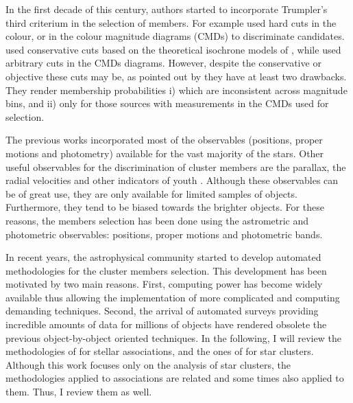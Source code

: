 In the first decade of this century, authors started to incorporate Trumpler's third criterium in the selection of members. For example \citet{2003A&A...400..891M, 2004A&A...416..125D,2007A&A...470..585B,Lodieu2012} used hard cuts in the colour, or in the colour magnitude diagrams (CMDs) to discriminate candidates. \citet{2003A&A...400..891M} used conservative cuts based on the theoretical isochrone models of \citet{1998A&A...337..403B}, while \citet{2004A&A...416..125D,2007A&A...470..585B,Lodieu2012} used arbitrary cuts in the CMDs diagrams. However, despite the conservative or objective these cuts may be, as pointed out by \citet{Sarro2014} they have at least two drawbacks. They render membership probabilities i) which are inconsistent across magnitude bins, and ii) only for those sources with measurements in the CMDs used for selection.
  
The previous works incorporated most of the observables (positions, proper motions and photometry) available for the vast majority of the stars. Other useful observables for the discrimination of cluster members are the parallax, the radial velocities and other indicators of youth \cite[e.g. lithium abundance, photospheric activity, rotation, see for example][]{2016A&A...596A.113B}.  Although these observables can be of great use, they are only available for limited samples of objects. Furthermore, they tend to be biased towards the brighter objects. For these reasons, the members selection has been done using the astrometric and photometric observables: positions, proper motions and photometric bands.

In recent years, the astrophysical community started to develop automated methodologies for the cluster members selection. This development has been motivated by two main reasons. First, computing power has become widely available thus allowing the implementation of more complicated and computing demanding techniques. Second, the arrival of automated surveys providing incredible amounts of data for millions of objects have rendered obsolete the previous object-by-object oriented techniques. In the following, I will review the methodologies of \citet{Malo2013,Gagne2014,Riedel2017} for stellar associations, and the ones of \citet{KroneMartins2014,Sarro2014,Sampedro2016} for star clusters. Although this work focuses only on the analysis of star clusters, the methodologies applied to associations are related and some times also applied to them. Thus, I review them as well.

